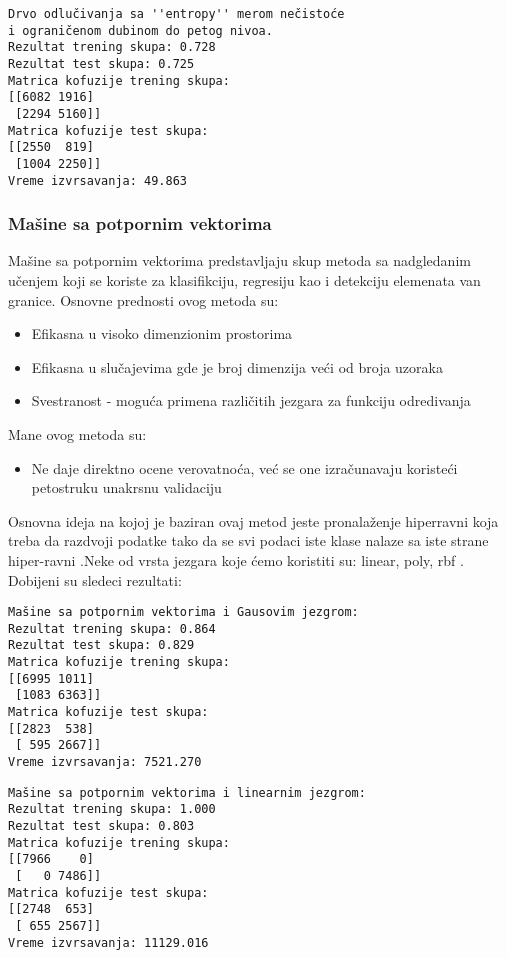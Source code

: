 \documentclass[a4paper]{article}
\begin{document}
\begin{tcolorbox}
\begin{verbatim}
Drvo odlučivanja sa ''entropy'' merom nečistoće
i ograničenom dubinom do petog nivoa.
Rezultat trening skupa: 0.728
Rezultat test skupa: 0.725
Matrica kofuzije trening skupa:
[[6082 1916]
 [2294 5160]]
Matrica kofuzije test skupa:
[[2550  819]
 [1004 2250]]
Vreme izvrsavanja: 49.863
\end{verbatim}
\end{tcolorbox}


\subsubsection{Mašine sa potpornim vektorima}
Mašine sa potpornim vektorima predstavljaju skup metoda sa nadgledanim učenjem koji se koriste za klasifikciju, regresiju kao i detekciju
elemenata van granice.
Osnovne prednosti ovog metoda su:
\begin{itemize}
\item Efikasna u visoko dimenzionim prostorima
\item  Efikasna u slučajevima gde je broj dimenzija veći od broja uzoraka
\item Svestranost - moguća primena različitih jezgara za funkciju odredivanja
\end{itemize}
Mane ovog metoda su:
\begin{itemize}
\item Ne daje direktno ocene verovatnoća, već se one izračunavaju koristeći
petostruku unakrsnu validaciju
\end{itemize}

Osnovna ideja na kojoj je baziran ovaj metod jeste pronalaženje hiperravni koja treba da razdvoji podatke tako da se svi podaci iste klase
nalaze sa iste strane hiper-ravni \cite{SVM} .Neke od  vrsta jezgara koje ćemo koristiti su: linear, poly, rbf .
Dobijeni su sledeci rezultati:

\begin{tcolorbox}
\begin{verbatim}
Mašine sa potpornim vektorima i Gausovim jezgrom:
Rezultat trening skupa: 0.864
Rezultat test skupa: 0.829
Matrica kofuzije trening skupa:
[[6995 1011]
 [1083 6363]]
Matrica kofuzije test skupa:
[[2823  538]
 [ 595 2667]]
Vreme izvrsavanja: 7521.270
\end{verbatim}
\end{tcolorbox}

\begin{tcolorbox}
\begin{verbatim}
Mašine sa potpornim vektorima i linearnim jezgrom:
Rezultat trening skupa: 1.000
Rezultat test skupa: 0.803
Matrica kofuzije trening skupa:
[[7966    0]
 [   0 7486]]
Matrica kofuzije test skupa:
[[2748  653]
 [ 655 2567]]
Vreme izvrsavanja: 11129.016
\end{verbatim}
\end{tcolorbox}
\end{document}
